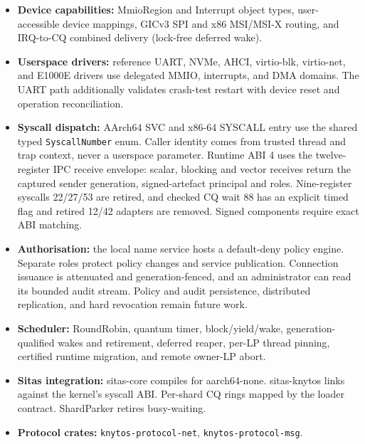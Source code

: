 \begin{itemize}
    \item \textbf{Device capabilities:} MmioRegion and Interrupt object types,
        user-accessible device mappings, GICv3 SPI and x86 MSI/MSI-X routing,
        and IRQ-to-CQ combined delivery (lock-free deferred wake).

    \item \textbf{Userspace drivers:} reference UART, NVMe, AHCI, virtio-blk,
        virtio-net, and E1000E drivers use delegated MMIO, interrupts, and DMA domains.
        The UART path additionally validates crash-test restart with device
        reset and operation reconciliation.

    \item \textbf{Syscall dispatch:} AArch64 SVC and x86-64 SYSCALL entry use
        the shared typed \texttt{SyscallNumber} enum. Caller identity comes
        from trusted thread and trap context, never a userspace parameter.
        Runtime ABI 4 uses the twelve-register IPC receive envelope:
        scalar, blocking and vector receives return the captured sender generation,
        signed-artefact principal and roles. Nine-register syscalls 22/27/53 are
        retired, and checked CQ wait 88 has an explicit timed flag and retired 12/42
        adapters are removed. Signed components require exact ABI matching.

    \item \textbf{Authorisation:} the local name service hosts a default-deny
        policy engine. Separate roles protect policy changes and service
        publication. Connection issuance is attenuated and generation-fenced, and
        an administrator can read its bounded audit stream. Policy and audit
        persistence, distributed replication, and hard revocation remain
        future work.

    \item \textbf{Scheduler:} RoundRobin, quantum timer, block/yield/wake,
        generation-qualified wakes and retirement, deferred reaper, per-LP
        thread pinning, certified runtime migration, and remote owner-LP abort.

    \item \textbf{Sitas integration:} sitas-core compiles for aarch64-none.
        sitas-knytos links against the kernel's syscall ABI. Per-shard CQ
        rings mapped by the loader contract. ShardParker retires busy-waiting.

    \item \textbf{Protocol crates:} \texttt{knytos-protocol-net},
        \texttt{knytos-protocol-msg}.


\end{itemize}
